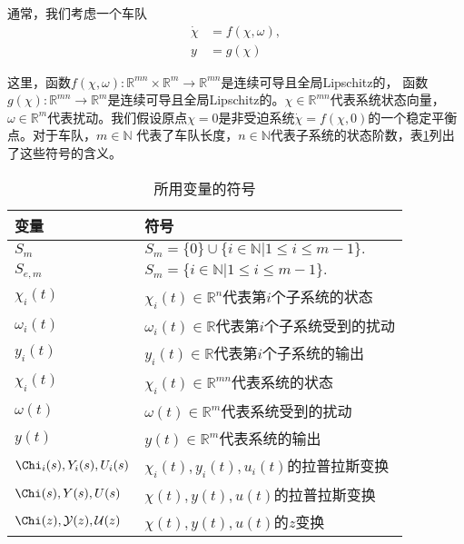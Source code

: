 \begin{translation}
  通常，我们考虑一个车队
  \begin{align}
    \dot{\chi} &= f(\chi, \omega), \\
    \label{eq:appendix-equation-7}
    y &= g(\chi)
  \end{align}

  这里，函数$f(\chi, \omega): \mathbb{R}^{mn} \times \mathbb{R}^m \rightarrow \mathbb{R}^{mn}$是连续可导且全局Lipschitz的，
  函数$g(\chi): \mathbb{R}^{mn} \rightarrow \mathbb{R}^{m}$是连续可导且全局Lipschitz的。$\chi \in \mathbb{R}^{mn}$代表系统状态向量，
  $\omega \in \mathbb{R}^m$代表扰动。我们假设原点$\chi = 0$是非受迫系统$\dot{\chi} = f(\chi, 0)$的一个稳定平衡点。对于车队，$m \in \mathbb{N}$
  代表了车队长度，$n \in \mathbb{N}$代表子系统的状态阶数，表\ref{tab:appendix-translation-table1}列出了这些符号的含义。

  \begin{table}
    \centering
    \caption{所用变量的符号}
    \begin{tabular}{ll}
      \toprule
      变量          & 符号                        \\
      \midrule
      $S_m$           & $S_m = \{0\} \cup \{i \in \mathbb{N} | 1 \leqslant i \leqslant m-1 \}.$ \\
      $S_{e,m}$       & $S_m = \{i \in \mathbb{N} | 1 \leqslant i \leqslant m-1 \}.$                     \\
      $\chi_i(t)$     & $\chi_i(t) \in \mathbb{R}^n$代表第$i$个子系统的状态   \\
      $\omega_i(t)$   & $\omega_i(t) \in \mathbb{R}$代表第$i$个子系统受到的扰动 \\
      $y_i(t)$        & $y_i(t) \in \mathbb{R}$代表第$i$个子系统的输出        \\
      $\chi_i(t)$     & $\chi_i(t) \in \mathbb{R}^{mn}$代表系统的状态        \\
      $\omega(t)$     & $\omega(t) \in \mathbb{R}^m$代表系统受到的扰动        \\
      $y(t)$          & $y(t) \in \mathbb{R}^m$代表系统的输出        \\
      $\Chi_i(s), Y_i(s), U_i(s)$   & $\chi_i(t), y_i(t), u_i(t)$的拉普拉斯变换        \\
      $\Chi(s), Y(s), U(s)$         & $\chi(t), y(t), u(t)$的拉普拉斯变换        \\
      $\mathcal{\Chi}(z), \mathcal{Y}(z), \mathcal{U}(z)$   & $\chi(t), y(t), u(t)$的$z$变换        \\
      \bottomrule
    \end{tabular}
    \label{tab:appendix-translation-table1}
  \end{table}



\end{translation}
